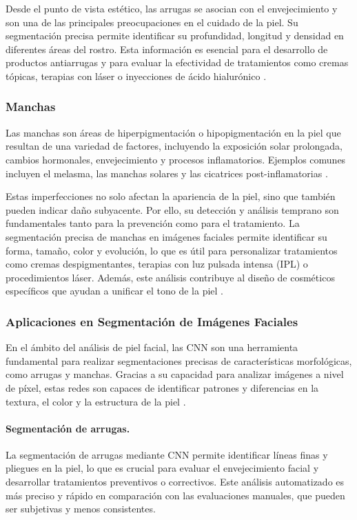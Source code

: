 Desde el punto de vista estético, las arrugas se asocian con el envejecimiento y son una de las principales preocupaciones en el cuidado de la piel. Su segmentación precisa permite identificar su profundidad, longitud y densidad en diferentes áreas del rostro. Esta información es esencial para el desarrollo de productos antiarrugas y para evaluar la efectividad de tratamientos como cremas tópicas, terapias con láser o inyecciones de ácido hialurónico \cite{autor2021arrugas}.

\subsubsection{Manchas}
Las manchas son áreas de hiperpigmentación o hipopigmentación en la piel que resultan de una variedad de factores, incluyendo la exposición solar prolongada, cambios hormonales, envejecimiento y procesos inflamatorios. Ejemplos comunes incluyen el melasma, las manchas solares y las cicatrices post-inflamatorias \cite{autor2019manchas}.

Estas imperfecciones no solo afectan la apariencia de la piel, sino que también pueden indicar daño subyacente. Por ello, su detección y análisis temprano son fundamentales tanto para la prevención como para el tratamiento. La segmentación precisa de manchas en imágenes faciales permite identificar su forma, tamaño, color y evolución, lo que es útil para personalizar tratamientos como cremas despigmentantes, terapias con luz pulsada intensa (IPL) o procedimientos láser. Además, este análisis contribuye al diseño de cosméticos específicos que ayudan a unificar el tono de la piel \cite{autor2019manchas}.
\subsubsection{Aplicaciones en Segmentación de Imágenes Faciales}  
En el ámbito del análisis de piel facial, las CNN son una herramienta fundamental para realizar segmentaciones precisas de características morfológicas, como arrugas y manchas. Gracias a su capacidad para analizar imágenes a nivel de píxel, estas redes son capaces de identificar patrones y diferencias en la textura, el color y la estructura de la piel \parencite{autor2021deeplab}.

\paragraph{Segmentación de arrugas.}  
La segmentación de arrugas mediante CNN permite identificar líneas finas y pliegues en la piel, lo que es crucial para evaluar el envejecimiento facial y desarrollar tratamientos preventivos o correctivos. Este análisis automatizado es más preciso y rápido en comparación con las evaluaciones manuales, que pueden ser subjetivas y menos consistentes.

